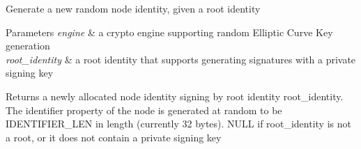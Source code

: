 Generate a new random node identity, given a root identity


\begin{DoxyParams}{Parameters}
{\em engine} & a crypto engine supporting random Elliptic Curve Key generation \\
\hline
{\em root\+\_\+identity} & a root identity that supports generating signatures with a private signing key \\
\hline
\end{DoxyParams}
\begin{DoxyReturn}{Returns}
a newly allocated node identity signing by root identity \textquotesingle{}root\+\_\+identity\textquotesingle{}. The \textquotesingle{}identifier\textquotesingle{} property of the node is generated at random to be \textquotesingle{}I\+D\+E\+N\+T\+I\+F\+I\+E\+R\+\_\+\+L\+EN\textquotesingle{} in length (currently 32 bytes). N\+U\+LL if root\+\_\+identity is not a root, or it does not contain a private signing key 
\end{DoxyReturn}
